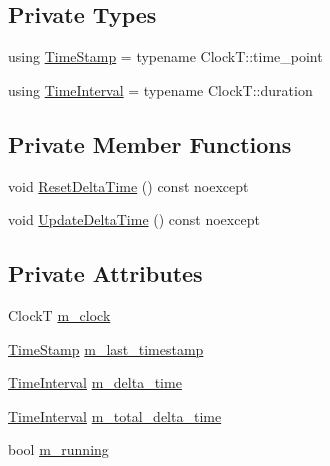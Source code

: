 \subsection*{Private Types}
\begin{DoxyCompactItemize}
\item 
using \hyperlink{classmage_1_1_timer_abd11aea6107940b09ef3c48f62c81668}{Time\+Stamp} = typename Clock\+T\+::time\+\_\+point
\item 
using \hyperlink{classmage_1_1_timer_a5c0fd78ceab0110637622bd0e9b8424d}{Time\+Interval} = typename Clock\+T\+::duration
\end{DoxyCompactItemize}
\subsection*{Private Member Functions}
\begin{DoxyCompactItemize}
\item 
void \hyperlink{classmage_1_1_timer_ac39577316a032bce5b009401d67d406b}{Reset\+Delta\+Time} () const noexcept
\item 
void \hyperlink{classmage_1_1_timer_a05cbba0b368e49cdf4bfebfd840e4118}{Update\+Delta\+Time} () const noexcept
\end{DoxyCompactItemize}
\subsection*{Private Attributes}
\begin{DoxyCompactItemize}
\item 
ClockT \hyperlink{classmage_1_1_timer_ad46016090f9ae8a282398d8fcc8e9e0e}{m\+\_\+clock}
\item 
\hyperlink{classmage_1_1_timer_abd11aea6107940b09ef3c48f62c81668}{Time\+Stamp} \hyperlink{classmage_1_1_timer_a01e35b71a5fe5eebe3b05c1b675cb5ce}{m\+\_\+last\+\_\+timestamp}
\item 
\hyperlink{classmage_1_1_timer_a5c0fd78ceab0110637622bd0e9b8424d}{Time\+Interval} \hyperlink{classmage_1_1_timer_a9cb9bf6cd0f567a8a1fad02a89d98aa2}{m\+\_\+delta\+\_\+time}
\item 
\hyperlink{classmage_1_1_timer_a5c0fd78ceab0110637622bd0e9b8424d}{Time\+Interval} \hyperlink{classmage_1_1_timer_aa62b280ee2b58a3f75440cc4faf10b23}{m\+\_\+total\+\_\+delta\+\_\+time}
\item 
bool \hyperlink{classmage_1_1_timer_a195789c583eb8bd3b9f0058214b74bc5}{m\+\_\+running}
\end{DoxyCompactItemize}


